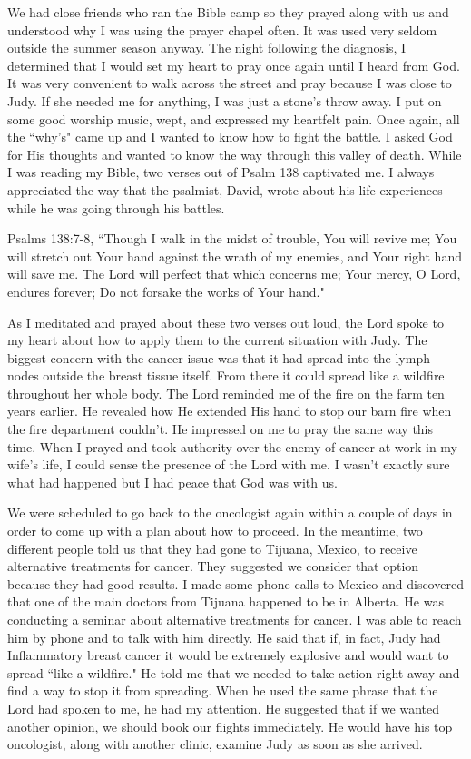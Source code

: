 \documentclass[oneside,12pt]{book}
\begin{document}
We had close friends who ran the Bible camp so they prayed along with us and understood why I was using the prayer chapel often. It was used very seldom outside the summer season anyway. The night following the diagnosis, I determined that I would set my heart to pray once again until I heard from God. It was very convenient to walk across the street and pray because I was close to Judy. If she needed me for anything, I was just a stone's throw away. I put on some good worship music, wept, and expressed my heartfelt pain. Once again, all the ``why's" came up and I wanted to know how to fight the battle. I asked God for His thoughts and wanted to know the way through this valley of death. While I was reading my Bible, two verses out of Psalm 138 captivated me. I always appreciated the way that the psalmist, David, wrote about his life experiences while he was going through his battles.

Psalms 138:7-8, ``Though I walk in the midst of trouble, You will revive me; You will stretch out Your hand against the wrath of my enemies, and Your right hand will save me. The Lord will perfect that which concerns me; Your mercy, O Lord, endures forever; Do not forsake the works of Your hand."

As I meditated and prayed about these two verses out loud, the Lord spoke to my heart about how to apply them to the current situation with Judy. The biggest concern with the cancer issue was that it had spread into the lymph nodes outside the breast tissue itself. From there it could spread like a wildfire throughout her whole body. The Lord reminded me of the fire on the farm ten years earlier. He revealed how He extended His hand to stop our barn fire when the fire department couldn't. He impressed on me to pray the same way this time. When I prayed and took authority over the enemy of cancer at work in my wife's life, I could sense the presence of the Lord with me. I wasn't exactly sure what had happened but I had peace that God was with us.

We were scheduled to go back to the oncologist again within a couple of days in order to come up with a plan about how to proceed. In the meantime, two different people told us that they had gone to Tijuana, Mexico, to receive alternative treatments for cancer. They suggested we consider that option because they had good results. I made some phone calls to Mexico and discovered that one of the main doctors from Tijuana happened to be in Alberta. He was conducting a seminar about alternative treatments for cancer. I was able to reach him by phone and to talk with him directly. He said that if, in fact, Judy had Inflammatory breast cancer it would be extremely explosive and would want to spread ``like a wildfire." He told me that we needed to take action right away and find a way to stop it from spreading. When he used the same phrase that the Lord had spoken to me, he had my attention. He suggested that if we wanted another opinion, we should book our flights immediately. He would have his top oncologist, along with another clinic, examine Judy as soon as she arrived. 
\end{document}
